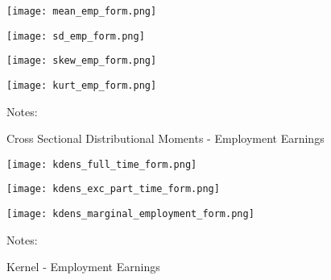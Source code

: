 \documentclass[12pt, a4paper]{article}
\begin{document}
\begin{figure}[!h]
\captionsetup{font=large}
\caption{Cross Sectional Distributional Moments - Employment Earnings}
	\begin{minipage}[b]{0.48\textwidth} 
		\centering
		\texttt{[image: mean\_emp\_form.png]}
		\label{fig:mean_emp_form}
	\end{minipage}
	\begin{minipage}[b]{0.48\textwidth}
		\centering
		\texttt{[image: sd\_emp\_form.png]}
		\label{fig:var_emp_form}
	\end{minipage}
	\begin{minipage}[b]{0.48\textwidth} 
		\centering
		\texttt{[image: skew\_emp\_form.png]}
		\label{fig:skew_emp_form}
	\end{minipage}
	\begin{minipage}[b]{0.48\textwidth}
		\centering
		\texttt{[image: kurt\_emp\_form.png]}
		\label{fig:kurt_emp_form}
	\end{minipage}
\footnotesize{
\justifying Notes: \par} 
\end{figure}

\begin{figure}[!h]
\centering
\captionsetup{font=large}
\caption{Kernel - Employment Earnings}
	\begin{minipage}[b]{0.32\textwidth} 
		\centering
		\texttt{[image: kdens\_full\_time\_form.png]}
		\label{fig:kdens_full_time_form}
	\end{minipage}
	\begin{minipage}[b]{0.32\textwidth}
		\centering
		\texttt{[image: kdens\_exc\_part\_time\_form.png]}
		\label{fig:kdens_exc_part_time_form}
	\end{minipage}
	\begin{minipage}[b]{0.32\textwidth} 
		\centering
		\texttt{[image: kdens\_marginal\_employment\_form.png]}
		\label{fig:kdens_marginal_employment_form}
	\end{minipage}
\footnotesize{
\justifying Notes: \par} 
\end{figure}

\end{document}
